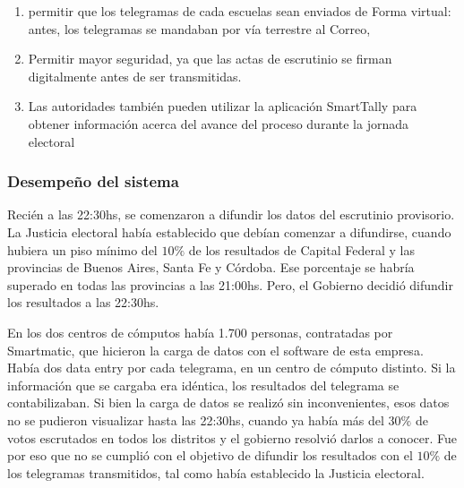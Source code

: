 \documentclass[titlepage,a4paper,twoside]{article}
\theoremstyle{definition}
\numberwithin{algorithm}{section}
\theoremstyle{remark}
\numberwithin{equation}{section}
\begin{document}
    \begin{enumerate}
    	\item permitir que los telegramas de cada escuelas sean enviados de Forma virtual: antes, los telegramas se mandaban por vía terrestre al Correo,
    	\item Permitir mayor seguridad, ya que las actas de escrutinio se firman digitalmente antes de ser transmitidas.
    	\item Las autoridades también pueden utilizar la aplicación SmartTally para obtener información acerca del avance del proceso durante la jornada electoral
    \end{enumerate}
    
    
    \subsubsection{Desempeño del sistema}
    
    
    Recién a las 22:30hs, se comenzaron a difundir los datos del escrutinio provisorio. La Justicia electoral había establecido que debían comenzar a difundirse, cuando hubiera un piso mínimo del $10\%$ de los resultados de Capital Federal y las provincias de Buenos Aires, Santa Fe y Córdoba. Ese porcentaje se habría superado en todas las provincias a las 21:00hs. Pero,  el Gobierno decidió difundir los resultados a las 22:30hs. 
    
    En los dos centros de cómputos había 1.700 personas, contratadas por Smartmatic, que hicieron la carga de datos con el software de esta empresa. Había dos data entry por cada telegrama, en un centro de cómputo distinto. Si la información que se cargaba era idéntica, los resultados del telegrama se contabilizaban. Si bien la carga de datos se realizó sin inconvenientes, esos datos no se pudieron visualizar hasta las 22:30hs, cuando ya había más del $30\%$ de votos escrutados en todos los distritos y el gobierno resolvió darlos a conocer. Fue por eso que no se cumplió con el objetivo de difundir los resultados con el $10\%$ de los telegramas transmitidos, tal como había establecido la Justicia electoral.
    
\end{document}
